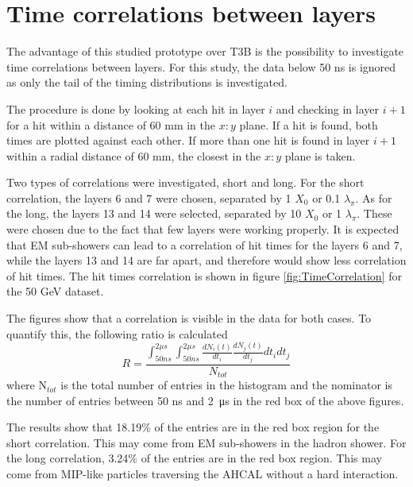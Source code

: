 \section{Time correlations between layers}

The advantage of this studied prototype over T3B is the possibility to investigate time correlations between layers. For this study, the data below 50 ns is ignored as only the tail of the timing distributions is investigated.

The procedure is done by looking at each hit in layer $i$ and checking in layer $i+1$ for a hit within a distance of 60 mm in the $x:y$ plane. If a hit is found, both times are plotted against each other. If more than one hit is found in layer $i+1$ within a radial distance of 60 mm, the closest in the $x:y$ plane is taken.

Two types of correlations were investigated, short and long. For the short correlation, the layers 6 and 7 were chosen, separated by 1 $X_0$ or 0.1 $\lambda_{\pi}$. As for the long, the layers 13 and 14 were selected, separated by 10 $X_0$ or 1 $\lambda_{\pi}$. These were chosen due to the fact that few layers were working properly. It is expected that EM sub-showers can lead to a correlation of hit times for the layers 6 and 7, while the layers 13 and 14 are far apart, and therefore would show less correlation of hit times. The hit times correlation is shown in figure \ref{fig:TimeCorrelation} for the 50 GeV dataset.

The figures show that a correlation is visible in the data for both cases. To quantify this, the following ratio is calculated
\begin{equation}\label{eq:CorrelCalcul}
	R = \frac{\int_{50 ns}^{2 \mu s} \int_{50 ns}^{2 \mu s} \frac{dN_i(t)}{dt_i} \frac{dN_j(t)}{dt_j} dt_i dt_j}{N_{tot}}
\end{equation}
where N$_{tot}$ is the total number of entries in the histogram and the nominator is the number of entries between 50 ns and \SI{2}{\micro\second} in the red box of the above figures.

The results show that 18.19\% of the entries are in the red box region for the short correlation. This may come from EM sub-showers in the hadron shower. For the long correlation, 3.24\% of the entries are in the red box region. This may come from MIP-like particles traversing the AHCAL without a hard interaction.

